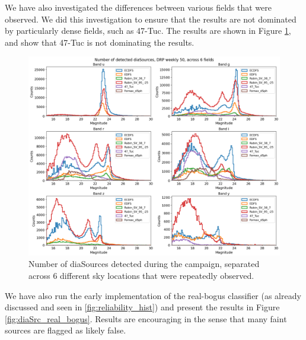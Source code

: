 We have also investigated the differences between various fields that were observed. We did this investigation to ensure that the results are not dominated by particularly dense fields, such as 47-Tuc. The results are shown in Figure \ref{fig:diaSrc_fields}, and show that 47-Tuc is not dominating the results.

\begin{figure}
  \includegraphics[width=\textwidth]{dia/figures/diaSources_50_6_fields.png}
  \caption{Number of diaSources detected during the campaign, separated across 6 different sky locations that were repeatedly observed.}
  \label{fig:diaSrc_fields}
\end{figure}

We have also run the early implementation of the real-bogus classifier (as already discussed and seen in \ref{fig:reliability_hist}) and present the results in Figure \ref{fig:diaSrc_real_bogus}. Results are encouraging in the sense that many faint sources are flagged as likely false. 

